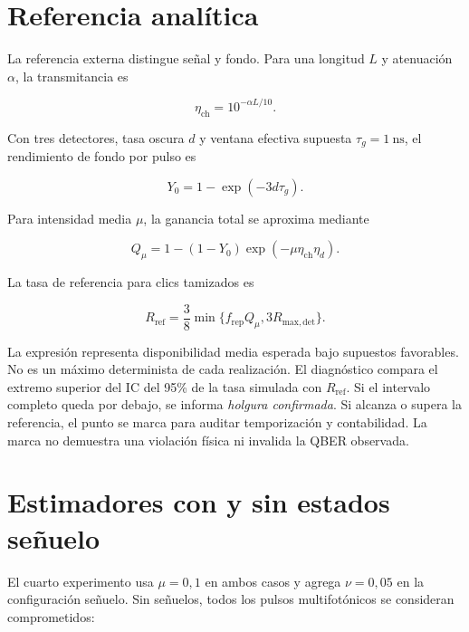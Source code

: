 \section{Referencia analítica}

La referencia externa distingue señal y fondo. Para una longitud \(L\) y atenuación \(\alpha\), la transmitancia es

\begin{equation}
  \eta_{\mathrm{ch}}=10^{-\alpha L/10}.
  \label{eq:transmitancia_metodo}
\end{equation}

Con tres detectores, tasa oscura \(d\) y ventana efectiva supuesta \(\tau_g=\SI{1}{\nano\second}\), el rendimiento de fondo por pulso es

\begin{equation}
  Y_0=1-\exp(-3d\tau_g).
  \label{eq:fondo_analitico}
\end{equation}

Para intensidad media \(\mu\), la ganancia total se aproxima mediante

\begin{equation}
  Q_\mu=1-(1-Y_0)\exp(-\mu\eta_{\mathrm{ch}}\eta_d).
  \label{eq:ganancia_metodo}
\end{equation}

La tasa de referencia para clics tamizados es

\begin{equation}
  R_{\mathrm{ref}}
  =\frac{3}{8}\min\{f_{\mathrm{rep}}Q_\mu,3R_{\mathrm{max,det}}\}.
  \label{eq:referencia_tasa}
\end{equation}

La expresión representa disponibilidad media esperada bajo supuestos favorables. No es un máximo determinista de cada realización. El diagnóstico compara el extremo superior del IC del 95\% de la tasa simulada con \(R_\mathrm{ref}\). Si el intervalo completo queda por debajo, se informa \emph{holgura confirmada}. Si alcanza o supera la referencia, el punto se marca para auditar temporización y contabilidad. La marca no demuestra una violación física ni invalida la QBER observada.

\section{Estimadores con y sin estados señuelo}

El cuarto experimento usa \(\mu=0{,}1\) en ambos casos y agrega \(\nu=0{,}05\) en la configuración señuelo. Sin señuelos, todos los pulsos multifotónicos se consideran comprometidos:

